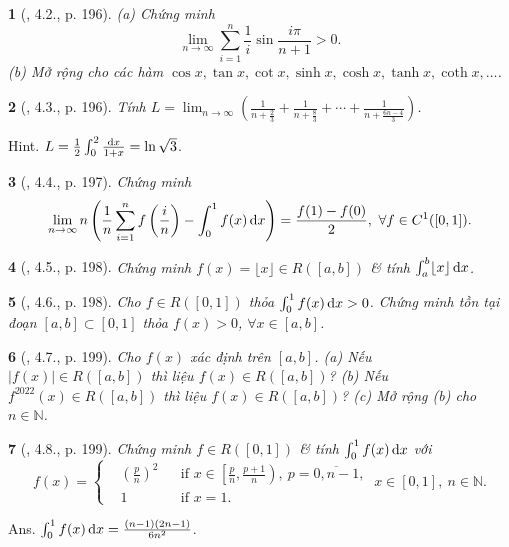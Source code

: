 \documentclass{article}
\newtheorem{baitoan}{}
\begin{document}
\begin{baitoan}[\cite{Quoc_Long_Dat_Nam_VMC}, 4.2., p. 196]
	(a) Chứng minh
	\begin{equation*}
		\lim_{n\to\infty} \sum_{i=1}^{n} \frac{1}{i}\sin\frac{i\pi}{n + 1} > 0.
	\end{equation*}
	(b) Mở rộng cho các hàm $\cos x,\tan x,\cot x,\sinh x,\cosh x,\tanh x,\coth x,\ldots$.
\end{baitoan}

\begin{baitoan}[\cite{Quoc_Long_Dat_Nam_VMC}, 4.3., p. 196]
	Tính $L = \lim_{n\to\infty} \left(\frac{1}{n + \frac{2}{3}} + \frac{1}{n + \frac{8}{3}} + \cdots + \frac{1}{n + \frac{6n - 4}{3}}\right)$.
\end{baitoan}
{\sf Hint.} $L = \frac{1}{2}\int_0^2 \frac{{\rm d}x}{1 + x} = \ln\sqrt{3}$.

\begin{baitoan}[\cite{Quoc_Long_Dat_Nam_VMC}, 4.4., p. 197]
	Chứng minh
	\begin{equation*}
		\lim_{n\to\infty} n\left(\frac{1}{n}\sum_{i=1}^n f\left(\frac{i}{n}\right) - \int_0^1 f(x)\,{\rm d}x\right) = \frac{f(1) - f(0)}{2},\ \forall f\in C^1([0,1]).
	\end{equation*}
\end{baitoan}

\begin{baitoan}[\cite{Quoc_Long_Dat_Nam_VMC}, 4.5., p. 198]
	Chứng minh $f(x) = \lfloor x\rfloor\in R([a,b])$ \& tính $\int_a^b \lfloor x\rfloor\,{\rm d}x$.
\end{baitoan}

\begin{baitoan}[\cite{Quoc_Long_Dat_Nam_VMC}, 4.6., p. 198]
	Cho $f\in R([0,1])$ thỏa $\int_0^1 f(x)\,{\rm d}x > 0$. Chứng minh tồn tại đoạn $[a,b]\subset[0,1]$ thỏa $f(x) > 0$, $\forall x\in[a,b]$.
\end{baitoan}

\begin{baitoan}[\cite{Quoc_Long_Dat_Nam_VMC}, 4.7., p. 199]
	Cho $f(x)$ xác định trên $[a,b]$. (a) Nếu $|f(x)|\in R([a,b])$ thì liệu $f(x)\in R([a,b])$? (b) Nếu $f^{2022}(x)\in R([a,b])$ thì liệu $f(x)\in R([a,b])$? (c) Mở rộng (b) cho $n\in\mathbb{N}$.
\end{baitoan}

\begin{baitoan}[\cite{Quoc_Long_Dat_Nam_VMC}, 4.8., p. 199]
	Chứng minh $f\in R([0,1])$ \& tính $\int_0^1 f(x)\,{\rm d}x$ với
	\begin{equation*}
		f(x) = \left\{\begin{split}
			&\left(\frac{p}{n}\right)^2&&\mbox{if } x\in\left[\frac{p}{n},\frac{p + 1}{n}\right),\ p = \overline{0,n-1},\\
			&1&&\mbox{if } x = 1.
		\end{split}\right.\ x\in[0,1],\ n\in\mathbb{N}.
	\end{equation*}
\end{baitoan}
{\sf Ans.} $\int_0^1 f(x)\,{\rm d}x = \frac{(n - 1)(2n - 1)}{6n^2}$.
\end{document}

